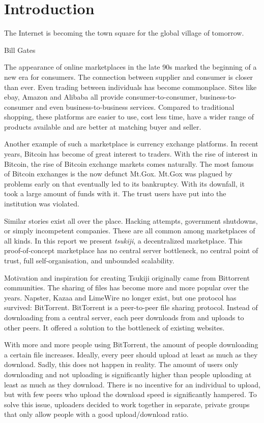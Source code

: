\section{Introduction}
\epigraph{The Internet is becoming the town square for the global village of tomorrow.}{Bill Gates}

The appearance of online marketplaces in the late 90s marked the beginning of a new era for consumers.
The connection between supplier and consumer is closer than ever.
Even trading between individuals has become commonplace.
Sites like ebay, Amazon and Alibaba all provide consumer-to-consumer, business-to-consumer and even business-to-business services.
Compared to traditional shopping, these platforms are easier to use, cost less time, have a wider range of products available and are better at matching buyer and seller.

Another example of such a marketplace is currency exchange platforms.
In recent years, Bitcoin has become of great interest to traders.
With the rise of interest in Bitcoin, the rise of Bitcoin exchange markets comes naturally.
The most famous of Bitcoin exchanges is the now defunct Mt.Gox.
Mt.Gox was plagued by problems early on that eventually led to its bankruptcy.
With its downfall, it took a large amount of funds with it.
The trust users have put into the institution was violated.


Similar stories exist all over the place. Hacking attempts, government shutdowns, or simply incompetent companies.
These are all common among marketplaces of all kinds.
In this report we present \textit{tsukiji}, a decentralized marketplace.
This proof-of-concept marketplace has no central server bottleneck, no central point of trust, full self-organisation, and unbounded scalability.

Motivation and inspiration for creating Tsukiji originally came from Bittorrent communities.
The sharing of files has become more and more popular over the years.
Napster, Kazaa and LimeWire no longer exist, but one protocol has survived: BitTorrent.
BitTorrent is a peer-to-peer file sharing protocol.
Instead of downloading from a central server, each peer downloads from and uploads to other peers.
It offered a solution to the bottleneck of existing websites.

With more and more people using BitTorrent, the amount of people downloading a certain file increases.
Ideally, every peer should upload at least as much as they download.
Sadly, this does not happen in reality.
The amount of users only downloading and not uploading is significantly higher than people uploading at least as much as they download.
There is no incentive for an individual to upload, but with few peers who upload the download speed is significantly hampered.
To solve this issue, uploaders decided to work together in separate, private groups that only allow people with a good upload/download ratio.

